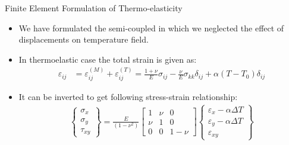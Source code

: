 \documentclass{beamer}
\begin{document}
\begin{frame}[t,fragile]{Finite Element Formulation of Thermo-elasticity}
\begin{itemize}
\item We have formulated the semi-coupled in which we neglected the effect of displacements on temperature field.
\item In thermoelastic case the total strain is given as: 
\begin{align*}
    \varepsilon_{ij}&=\varepsilon_{ij}^{(M)}+\varepsilon_{ij}^{(T)}
    =\frac{1+\nu}{E}\sigma_{ij}-\frac{\nu}{E}\sigma_{kk}\delta_{ij}+\alpha(T-T_0)\delta_{ij}\nonumber
\end{align*}
\item It can be inverted to get following stress-strain relationship:
    \footnotesize
\begin{align*}
    \begin{Bmatrix}
        \sigma_{x}\\ \sigma_{y}\\ \tau_{xy} 
    \end{Bmatrix} =\frac{E}{(1-\nu^2)}
    \begin{bmatrix}
        1 & \nu & 0 \\ \nu & 1 & 0 \\ 0 & 0 & 1-\nu 
    \end{bmatrix}
    \begin{Bmatrix}
        \varepsilon_{x}-\alpha\Delta T \\ \varepsilon_{y}-\alpha \Delta T \\ \varepsilon_{xy} 
    \end{Bmatrix}
\end{align*}
\end{itemize}

\end{frame}
\end{document}

